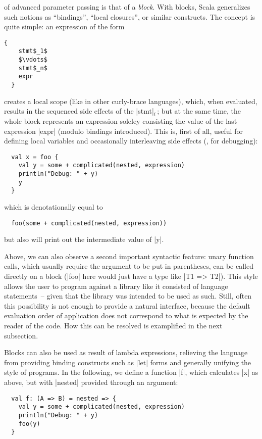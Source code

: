  of advanced parameter passing is that of a \emph{block}. With
blocks, Scala generalizes such notions as \enquote{bindings}, \enquote{local closures}, or similar
constructs. The concept is quite simple: an expression of the form
\begin{lstlisting}[mathescape]
  {
    stmt$_1$
    $\vdots$
    stmt$_n$
    expr
  }
\end{lstlisting}
creates a local scope (like in other curly-brace languages), which, when evaluated, results in the
sequenced side effects of the |stmt|$_i$\,; but at the same time, the whole block represents an
expression soleley consisting the value of the last expression |expr| (modulo bindings
introduced). This is, first of all, useful for defining local variables and occasionally
interleaving side effects (\eg, for debugging):
\begin{lstlisting}
  val x = foo {
    val y = some + complicated(nested, expression)
    println("Debug: " + y)
    y
  }
\end{lstlisting}
which is denotationally equal to
\begin{lstlisting}
  foo(some + complicated(nested, expression))
\end{lstlisting}
but also will print out the intermediate value of |y|.

Above, we can also observe a second important syntactic feature: unary function calls, which usually
require the argument to be put in parentheses, can be called directly on a block (|foo| here would
just have a type like |T1 => T2|). This style allows the user to program against a library like it
consisted of language statements~-- given that the library was intended to be used as such. Still,
often this possibility is not enough to provide a natural interface, because the default evaluation
order of application does not correspond to what is expected by the reader of the code. How this can
be resolved is examplified in the next subsection.

Blocks can also be used as result of lambda expressions, relieving the language from providing
binding constructs such as |let| forms and generally unifying the style of programs. In the
following, we define a function |f|, which calculates |x| as above, but with |nested| provided
through an argument:
\begin{lstlisting}
  val f: (A => B) = nested => {
    val y = some + complicated(nested, expression)
    println("Debug: " + y)
    foo(y)
  }
\end{lstlisting}

